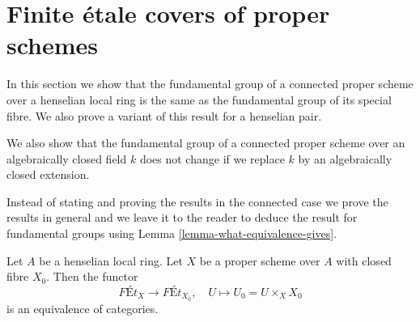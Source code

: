 \section{Finite \'etale covers of proper schemes}
\label{section-finite-etale-over-proper}

\noindent
In this section we show that the fundamental group of a connected proper
scheme over a henselian local ring is the same as the fundamental
group of its special fibre. We also prove a variant of this result for
a henselian pair.

\medskip\noindent
We also show that the fundamental
group of a connected proper scheme over an algebraically closed field $k$
does not change if we replace $k$ by an algebraically closed extension.

\medskip\noindent
Instead of stating and proving the results in the connected case
we prove the results in general and we leave it to the reader to deduce
the result for fundamental groups using
Lemma \ref{lemma-what-equivalence-gives}.

\begin{lemma}
\label{lemma-finite-etale-on-proper-over-henselian}
Let $A$ be a henselian local ring. Let $X$ be a proper scheme over $A$
with closed fibre $X_0$. Then the functor
$$
\textit{F\'Et}_X \to \textit{F\'Et}_{X_0},\quad
U \longmapsto U_0 = U \times_X X_0
$$
is an equivalence of categories.
\end{lemma}

